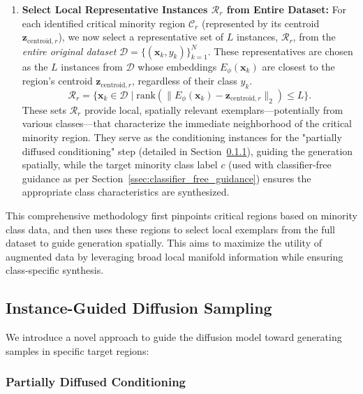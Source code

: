 \documentclass{article}
\begin{document}
\begin{enumerate}
    \item \textbf{Select Local Representative Instances $\mathcal{R}_r$ from Entire Dataset:} For each identified critical minority region $\mathcal{C}_r$ (represented by its centroid $\mathbf{z}_{\text{centroid},r}$), we now select a representative set of $L$ instances, $\mathcal{R}_r$, from the \textit{entire original dataset} $\mathcal{D} = \{(\mathbf{x}_k, y_k)\}_{k=1}^N$. These representatives are chosen as the $L$ instances from $\mathcal{D}$ whose embeddings $E_\phi(\mathbf{x}_k)$ are closest to the region's centroid $\mathbf{z}_{\text{centroid},r}$, regardless of their class $y_k$.
    \begin{equation}
    \mathcal{R}_r = \{\mathbf{x}_k \in \mathcal{D} \mid \text{rank}(\|E_\phi(\mathbf{x}_k) - \mathbf{z}_{\text{centroid},r}\|_2) \leq L \}.
    \end{equation}
    These sets $\mathcal{R}_r$ provide local, spatially relevant exemplars—potentially from various classes—that characterize the immediate neighborhood of the critical minority region. They serve as the conditioning instances for the "partially diffused conditioning" step (detailed in Section~\ref{ssec:partially_diffused_conditioning}), guiding the generation spatially, while the target minority class label $c$ (used with classifier-free guidance as per Section~\ref{ssec:classifier_free_guidance}) ensures the appropriate class characteristics are synthesized.
\end{enumerate}
This comprehensive methodology first pinpoints critical regions based on minority class data, and then uses these regions to select local exemplars from the full dataset to guide generation spatially. This aims to maximize the utility of augmented data by leveraging broad local manifold information while ensuring class-specific synthesis.


\subsection{Instance-Guided Diffusion Sampling}
\label{sec:instance_guided_sampling}

We introduce a novel approach to guide the diffusion model toward generating samples in specific target regions:

\subsubsection{Partially Diffused Conditioning}
\label{ssec:partially_diffused_conditioning}
\end{document}
